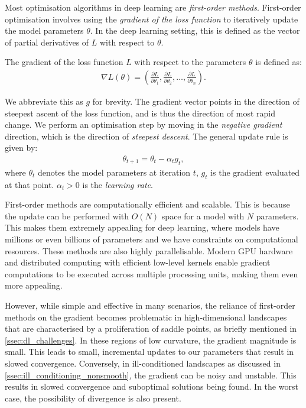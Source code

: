 Most optimisation algorithms in deep learning are \textit{first-order methods}. First-order optimisation involves using the \textit{gradient of the loss function} to iteratively update the model parameters $\theta$. In the deep learning setting, this is defined as the vector of partial derivatives of $L$ with respect to $\theta$.
\begin{definition}
    The gradient of the loss function $L$ with respect to the parameters $\theta$ is defined as:
    \begin{align}
        \nabla L(\theta) = \left(\frac{\partial L}{\partial \theta_1}, \frac{\partial L}{\partial \theta_2}, \ldots, \frac{\partial L}{\partial \theta_n}\right).
    \end{align}
\end{definition}

We abbreviate this as $g$ for brevity. The gradient vector points in the direction of steepest ascent of the loss function, and is thus the direction of most rapid change. We perform an optimisation step by moving in the \textit{negative gradient} direction, which is the direction of \textit{steepest descent}. The general update rule is given by:
\begin{align}
    \theta_{t+1} = \theta_t - \alpha_t g_t,
    \label{equation:first_order_update}
\end{align}
where $\theta_t$ denotes the model parameters at iteration $t$, $g_t$ is the gradient evaluated at that point. $\alpha_t > 0$ is the \textit{learning rate}. 

First-order methods are computationally efficient and scalable. This is because the update can be performed with $O(N)$ space for a model with $N$ parameters. This makes them extremely appealing for deep learning, where models have millions or even billions of parameters and we have constraints on computational resources. These methods are also highly parallelisable. Modern GPU hardware and distributed computing with efficient low-level kernels enable gradient computations to be executed across multiple processing units, making them even more appealing.

However, while simple and effective in many scenarios, the reliance of first-order methods on the gradient becomes problematic in high-dimensional landscapes that are characterised by a proliferation of saddle points, as briefly mentioned in \cref{ssec:dl_challenges}. In these regions of low curvature, the gradient magnitude is small. This leads to small, incremental updates to our parameters that result in slowed convergence. Conversely, in ill-conditioned landscapes as discussed in \cref{ssec:ill_conditioning_nonsmooth}, the gradient can be noisy and unstable. This results in slowed convergence and suboptimal solutions being found. In the worst case, the possibility of divergence is also present. 

